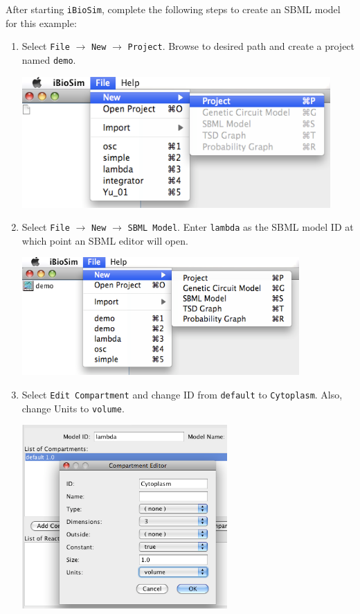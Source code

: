 \documentclass[titlepage,11pt]{article}
\begin{document}
\noindent
After starting {\tt iBioSim}, complete the following steps to create
an SBML model for this example:
\begin{enumerate}
\item Select {\tt File} $\rightarrow$ {\tt New} $\rightarrow$ {\tt Project}.
      Browse to desired path and create a project named {\tt demo}.

\includegraphics[height=50mm]{screenshots/project}

\item Select {\tt File} $\rightarrow$ {\tt New} $\rightarrow$ {\tt SBML Model}.
      Enter {\tt lambda} as the SBML model ID at which point an SBML
      editor will open.

\includegraphics[height=45mm]{screenshots/newModel}

\item Select {\tt Edit Compartment} and change ID from {\tt default} 
to {\tt Cytoplasm}.  Also, change Units to {\tt volume}.

\includegraphics[height=70mm]{screenshots/compartment}


\end{enumerate}
\end{document}
